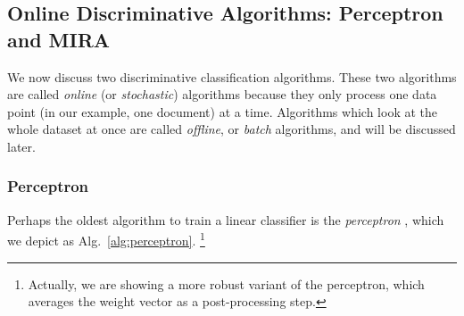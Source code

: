 \subsection{Online Discriminative Algorithms: Perceptron and MIRA}

We now discuss two discriminative classification algorithms. These two algorithms are called \emph{online} (or \emph{stochastic}) algorithms because they only process one data point (in our example, one document) at a time. Algorithms which look at the whole dataset at once are called \emph{offline}, or \emph{batch} algorithms, and will be discussed later.

\subsubsection{\label{s:perceptron} Perceptron}

Perhaps the oldest algorithm to train a linear classifier is the \emph{perceptron} \citep{Rosenblatt1958}, 
which we depict as Alg.~\ref{alg:perceptron}.%
\footnote{Actually, we are showing a more robust variant of the perceptron, 
which averages the weight vector as a post-processing step.} 

